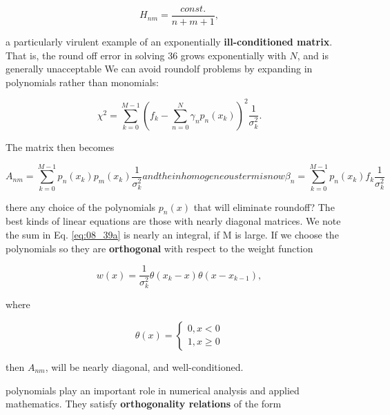\begin{equation}
H_{nm} = \frac{const.}{n+m+1} ,
\end{equation}

a particularly virulent example of an exponentially \textbf{ill-conditioned matrix}. That is, the round off error in solving 36 grows exponentially with $N$, and is generally unacceptable We can avoid roundolf problems by expanding in polynomials rather than monomials:

\begin{equation}\label{eq:08_38}
\chi^{2} = \sum_{k=0}^{M-1} (f_{k} - \sum_{n=0}^{N} \gamma_{n}p_{n}(x_{k}) )^2 \frac{1}{\sigma_{k}^{2}} .
\end{equation}

The matrix then becomes

\begin{subequations}
    \begin{equation}\label{eq:08_39a}
    A_{nm} = \sum_{k=0}^{M-1} p_{n}(x_{k})p_{m}(x_{k}) \frac{1}{\sigma_{k}^{2}}
    \end{equation}
and the inhomogeneous term is now
    \begin{equation}
    \beta_{n} = \sum_{k=0}^{M-1} p_{n}(x_{k})f_{k} \frac{1}{\sigma_{k}^{2}}
    \end{equation}
\end{subequations}

 there any choice of the polynomials $p_{n}(x)$ that will eliminate roundoff? The best kinds of linear equations are those with nearly diagonal matrices. We note the sum in Eq. \ref{eq:08_39a} is nearly an integral, if M is large. If we choose the polynomials so they are \textbf{orthogonal} with respect to the weight function

\begin{equation*}
w(x) = \frac{1}{\sigma_{k}^{2}} \theta(x_{k} - x ) \theta(x - x_{k-1}),
\end{equation*}

where

\begin{equation*}
\theta(x) =
    \begin{cases}
        0, x < 0 \\
        1, x \geq 0
    \end{cases}
\end{equation*}

then $A_{nm}$, will be nearly diagonal, and well-conditioned.

 polynomials play an important role in numerical analysis and applied mathematics. They satisfy \textbf{orthogonality relations} of the form

